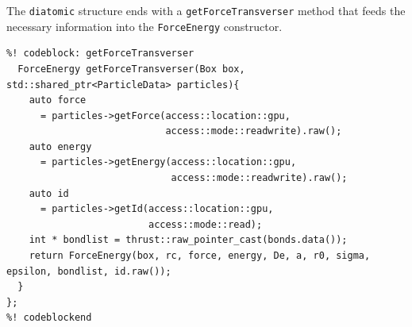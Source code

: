 The \texttt{diatomic} structure ends with a \texttt{getForceTransverser} method 
that feeds the necessary information into the \texttt{ForceEnergy} constructor.
\begin{lstlisting}
%! codeblock: getForceTransverser
  ForceEnergy getForceTransverser(Box box, std::shared_ptr<ParticleData> particles){
    auto force
      = particles->getForce(access::location::gpu,
                            access::mode::readwrite).raw();
    auto energy
      = particles->getEnergy(access::location::gpu,
                             access::mode::readwrite).raw();
    auto id
      = particles->getId(access::location::gpu,
                         access::mode::read);
    int * bondlist = thrust::raw_pointer_cast(bonds.data());
    return ForceEnergy(box, rc, force, energy, De, a, r0, sigma, epsilon, bondlist, id.raw());
  }
};
%! codeblockend
\end{lstlisting}

